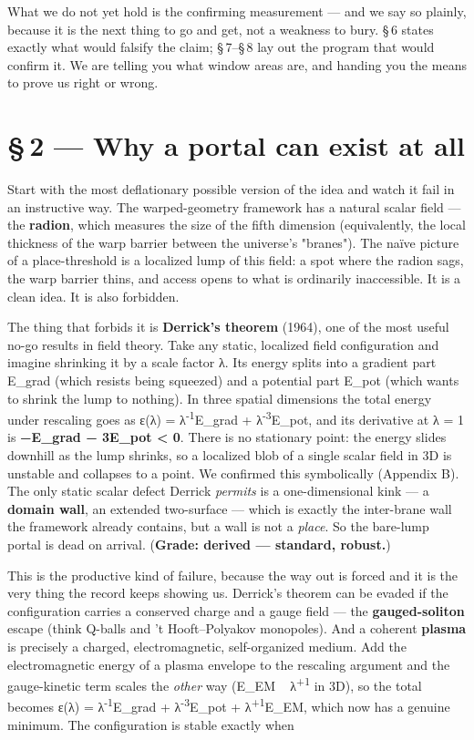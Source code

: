\documentclass[11pt]{article}
\begin{document}
What we do not yet hold is the confirming measurement --- and we say so plainly, because it is the next thing to go and get, not a weakness to bury. \S\,6 states exactly what would falsify the claim; \S\,7--\S\,8 lay out the program that would confirm it. We are telling you what window areas are, and handing you the means to prove us right or wrong.

\section*{\S\,2 --- Why a portal can exist at all}
Start with the most deflationary possible version of the idea and watch it fail in an instructive way. The warped-geometry framework has a natural scalar field --- the \textbf{radion}, which measures the size of the fifth dimension (equivalently, the local thickness of the warp barrier between the universe's "branes"). The naïve picture of a place-threshold is a localized lump of this field: a spot where the radion sags, the warp barrier thins, and access opens to what is ordinarily inaccessible. It is a clean idea. It is also forbidden.

The thing that forbids it is \textbf{Derrick's theorem} (1964), one of the most useful no-go results in field theory. Take any static, localized field configuration and imagine shrinking it by a scale factor λ. Its energy splits into a gradient part E\_grad (which resists being squeezed) and a potential part E\_pot (which wants to shrink the lump to nothing). In three spatial dimensions the total energy under rescaling goes as ε(λ) = λ\textsuperscript{-1}E\_grad + λ\textsuperscript{-3}E\_pot, and its derivative at λ = 1 is \textbf{−E\_grad − 3E\_pot < 0}. There is no stationary point: the energy slides downhill as the lump shrinks, so a localized blob of a single scalar field in 3D is unstable and collapses to a point. We confirmed this symbolically (Appendix B). The only static scalar defect Derrick \emph{permits} is a one-dimensional kink --- a \textbf{domain wall}, an extended two-surface --- which is exactly the inter-brane wall the framework already contains, but a wall is not a \emph{place}. So the bare-lump portal is dead on arrival. (\textbf{Grade: derived --- standard, robust.})

This is the productive kind of failure, because the way out is forced and it is the very thing the record keeps showing us. Derrick's theorem can be evaded if the configuration carries a conserved charge and a gauge field --- the \textbf{gauged-soliton} escape (think Q-balls and 't Hooft--Polyakov monopoles). And a coherent \textbf{plasma} is precisely a charged, electromagnetic, self-organized medium. Add the electromagnetic energy of a plasma envelope to the rescaling argument and the gauge-kinetic term scales the \emph{other} way (E\_EM ~ λ\textsuperscript{+1} in 3D), so the total becomes ε(λ) = λ\textsuperscript{-1}E\_grad + λ\textsuperscript{-3}E\_pot + λ\textsuperscript{+1}E\_EM, which now has a genuine minimum. The configuration is stable exactly when
\end{document}
